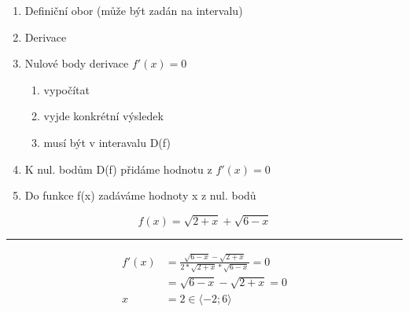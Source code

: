 \begin{enumerate}
  \item Definiční obor (může být zadán na intervalu)
  \item Derivace
  \item Nulové body derivace $f'(x)=0$
    \begin{enumerate}[label=(\alph*)]
      \item vypočítat
      \item vyjde konkrétní výsledek
      \item musí být v interavalu D(f)
    \end{enumerate}
  \item K nul. bodům D(f) přidáme hodnotu z $f'(x)=0$
  \item Do funkce f(x) zadáváme hodnoty x z nul. bodů
\end{enumerate}
\begin{equation}
  f(x)=\sqrt{2+x}+\sqrt{6-x}
\end{equation}
\hrule
\begin{align*}
  f'(x)&=\frac{\sqrt{6-x}-\sqrt{2+x}}{2*\sqrt{2+x}*\sqrt{6-x}}=0\\
  &=\sqrt{6-x}-\sqrt{2+x}=0\\
  x&=2\in\langle-2;6\rangle
\end{align*}
\begin{center}
\end{center}


